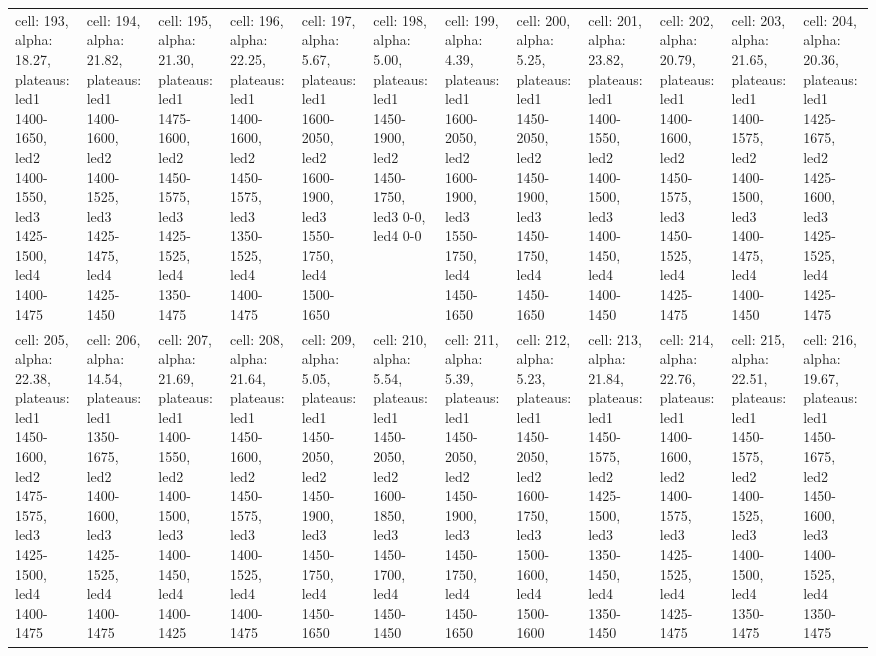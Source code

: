 \documentclass{article}
\begin{document}
\begin{landscape}
\begin{longtable}{|p{1.5cm}|p{1.5cm}|p{1.5cm}|p{1.5cm}|p{1.5cm}|p{1.5cm}|p{1.5cm}|p{1.5cm}|p{1.5cm}|p{1.5cm}|p{1.5cm}|p{1.5cm}|}
\rowcolor{lightgray} cell: 193, alpha: 18.27, plateaus: led1 1400-1650, led2 1400-1550, led3 1425-1500, led4 1400-1475 &cell: 194, alpha: 21.82, plateaus: led1 1400-1600, led2 1400-1525, led3 1425-1475, led4 1425-1450 &cell: 195, alpha: 21.30, plateaus: led1 1475-1600, led2 1450-1575, led3 1425-1525, led4 1350-1475 &cell: 196, alpha: 22.25, plateaus: led1 1400-1600, led2 1450-1575, led3 1350-1525, led4 1400-1475 &cell: 197, alpha: 5.67, plateaus: led1 1600-2050, led2 1600-1900, led3 1550-1750, led4 1500-1650 &cell: 198, alpha: 5.00, plateaus: led1 1450-1900, led2 1450-1750, led3 0-0, led4 0-0 &cell: 199, alpha: 4.39, plateaus: led1 1600-2050, led2 1600-1900, led3 1550-1750, led4 1450-1650 &cell: 200, alpha: 5.25, plateaus: led1 1450-2050, led2 1450-1900, led3 1450-1750, led4 1450-1650 &cell: 201, alpha: 23.82, plateaus: led1 1400-1550, led2 1400-1500, led3 1400-1450, led4 1400-1450 &cell: 202, alpha: 20.79, plateaus: led1 1400-1600, led2 1450-1575, led3 1450-1525, led4 1425-1475 &cell: 203, alpha: 21.65, plateaus: led1 1400-1575, led2 1400-1500, led3 1400-1475, led4 1400-1450 &cell: 204, alpha: 20.36, plateaus: led1 1425-1675, led2 1425-1600, led3 1425-1525, led4 1425-1475 \\
cell: 205, alpha: 22.38, plateaus: led1 1450-1600, led2 1475-1575, led3 1425-1500, led4 1400-1475 &cell: 206, alpha: 14.54, plateaus: led1 1350-1675, led2 1400-1600, led3 1425-1525, led4 1400-1475 &cell: 207, alpha: 21.69, plateaus: led1 1400-1550, led2 1400-1500, led3 1400-1450, led4 1400-1425 &cell: 208, alpha: 21.64, plateaus: led1 1450-1600, led2 1450-1575, led3 1400-1525, led4 1400-1475 &cell: 209, alpha: 5.05, plateaus: led1 1450-2050, led2 1450-1900, led3 1450-1750, led4 1450-1650 &cell: 210, alpha: 5.54, plateaus: led1 1450-2050, led2 1600-1850, led3 1450-1700, led4 1450-1450 &cell: 211, alpha: 5.39, plateaus: led1 1450-2050, led2 1450-1900, led3 1450-1750, led4 1450-1650 &cell: 212, alpha: 5.23, plateaus: led1 1450-2050, led2 1600-1750, led3 1500-1600, led4 1500-1600 &cell: 213, alpha: 21.84, plateaus: led1 1450-1575, led2 1425-1500, led3 1350-1450, led4 1350-1450 &cell: 214, alpha: 22.76, plateaus: led1 1400-1600, led2 1400-1575, led3 1425-1525, led4 1425-1475 &cell: 215, alpha: 22.51, plateaus: led1 1450-1575, led2 1400-1525, led3 1400-1500, led4 1350-1475 &cell: 216, alpha: 19.67, plateaus: led1 1450-1675, led2 1450-1600, led3 1400-1525, led4 1350-1475 \\

\end{longtable}
\end{landscape}
\end{document}
